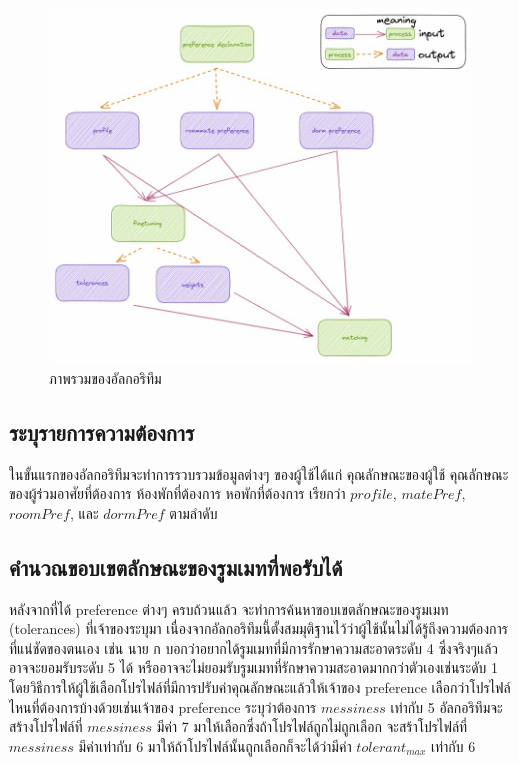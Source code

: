 \begin{figure}[ht]
  \begin{center}
    \includegraphics[width=\linewidth]{photo/diagram/matching-flow.jpeg}
  \end{center}
  \caption{ภาพรวมของอัลกอริทึม}
  \label{fig:match-overall}
\end{figure}

\subsection{ระบุรายการความต้องการ}
ในขั้นแรกของอัลกอริทึมจะทำการรวบรวมข้อมูลต่างๆ ของผู้ใช้ได้แก่ 
คุณลักษณะของผู้ใช้ คุณลักษณะของผู้ร่วมอาศัยที่ต้องการ ห้องพักที่ต้องการ หอพักที่ต้องการ เรียกว่า $\mathit{profile}$, $\mathit{matePref}$, $\mathit{roomPref}$,
และ $\mathit{dormPref}$ ตามลำดับ

\subsection{คำนวณขอบเขตลักษณะของรูมเมทที่พอรับได้}
หลังจากที่ได้ preference ต่างๆ ครบถ้วนแล้ว จะทำการค้นหาขอบเขตลักษณะของรูมเมท (tolerances) ที่เจ้าของระบุมา
เนื่องจากอัลกอริทึมนี้ตั้งสมมุติฐานไว้ว่าผู้ใช้นั้นไม่ได้รู้ถึงความต้องการที่แน่ชัดของตนเอง เช่น 
นาย ก บอกว่าอยากได้รูมเมทที่มีการรักษาความสะอาดระดับ 4 ซึ่งจริงๆแล้ว อาจจะยอมรับระดับ 5 ได้ หรืออาจจะไม่ยอมรับรูมเมทที่รักษาความสะอาดมากกว่าตัวเองเช่นระดับ 1
โดยวิธีการให้ผู้ใช้เลือกโปรไฟล์ที่มีการปรับค่าคุณลักษณะแล้วให้เจ้าของ preference เลือกว่าโปรไฟล์ไหนที่ต้องการบ้างด้วยเช่นเจ้าของ preference ระบุว่าต้องการ $messiness$ เท่ากับ 5
อัลกอริทึมจะสร้างโปรไฟล์ที่ $messiness$ มีค่า 7 มาให้เลือกซึ่งถ้าโปรไฟล์ถูกไม่ถูกเลือก จะสร้าโปรไฟล์ที่ $messiness$ มีค่าเท่ากับ 6 มาให้ถ้าโปรไฟล์นั้นถูกเลือกก็จะได้ว่ามีค่า $tolerant_{max}$ เท่ากับ 6 


